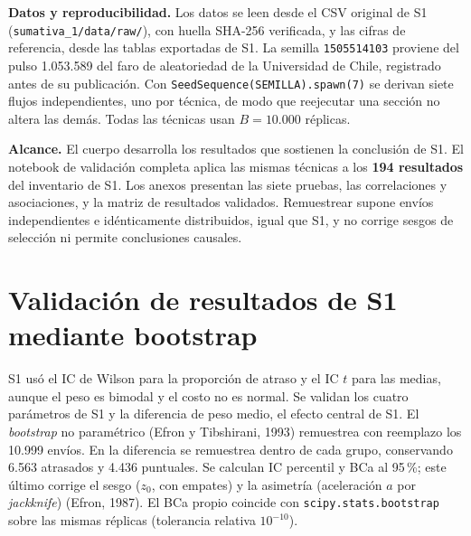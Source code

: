 \documentclass[11pt,a4paper]{article}
\newcommand{\codigo}[1]{{\small\texttt{#1}}}
\begin{document}
\textbf{Datos y reproducibilidad.} Los datos se leen desde el CSV original de S1 (\codigo{sumativa\_1/data/raw/}), con huella SHA-256 verificada, y las cifras de referencia, desde las tablas exportadas de S1. La semilla \codigo{1505514103} proviene del pulso 1.053.589 del faro de aleatoriedad de la Universidad de Chile, registrado antes de su publicación. Con \codigo{SeedSequence(SEMILLA).spawn(7)} se derivan siete flujos independientes, uno por técnica, de modo que reejecutar una sección no altera las demás. Todas las técnicas usan $B = 10.000$ réplicas.

\textbf{Alcance.} El cuerpo desarrolla los resultados que sostienen la conclusión de S1. El notebook de validación completa aplica las mismas técnicas a los \textbf{194 resultados} del inventario de S1. Los anexos presentan las siete pruebas, las correlaciones y asociaciones, y la matriz de resultados validados. Remuestrear supone envíos independientes e idénticamente distribuidos, igual que S1, y no corrige sesgos de selección ni permite conclusiones causales.

\section{Validación de resultados de S1 mediante bootstrap}

S1 usó el IC de Wilson para la proporción de atraso y el IC $t$ para las medias, aunque el peso es bimodal y el costo no es normal. Se validan los cuatro parámetros de S1 y la diferencia de peso medio, el efecto central de S1. El \emph{bootstrap} no paramétrico (Efron y Tibshirani, 1993) remuestrea con reemplazo los 10.999 envíos. En la diferencia se remuestrea dentro de cada grupo, conservando 6.563 atrasados y 4.436 puntuales. Se calculan IC percentil y BCa al 95\,\%; este último corrige el sesgo ($z_0$, con empates) y la asimetría (aceleración $a$ por \emph{jackknife}) (Efron, 1987). El BCa propio coincide con \codigo{scipy.stats.bootstrap} sobre las mismas réplicas (tolerancia relativa $10^{-10}$).
\end{document}
